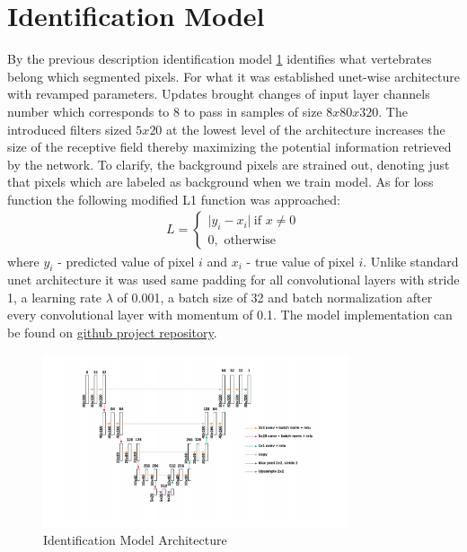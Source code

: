 \section{Identification Model}
By the previous description identification model \ref{fig:identification_model} identifies what vertebrates belong which segmented pixels. For what it was established unet-wise architecture with revamped parameters. Updates brought changes of input layer channels number which corresponds to 8 to pass in samples of size $8x80x320$. The introduced filters sized $5x20$ at the lowest level of the architecture  increases the size of the receptive field thereby maximizing the potential information retrieved by the network. To clarify, the background pixels are strained out, denoting just that pixels which are labeled as background when we train model. As for loss function the following modified L1 function was approached:
\begin{align*}
 L = \begin{cases} \lvert y_i - x_i \rvert\ \mbox{if } x\mbox{$\neq 0$} \\ 0, \mbox{ otherwise} \end{cases}
\end{align*}
where $y_i$ - predicted value of pixel $i$ and $x_i$ - true value of pixel $i$.
Unlike standard unet architecture it was used same padding for all convolutional layers with stride 1, a learning rate
$\lambda$ of 0.001, a batch size of 32 and batch normalization after every convolutional layer with momentum of 0.1. The model implementation can be found on \href{https://github.com/KumundzhievMaxim/VertebraeSegmentation/blob/main/train_identification_model.py}{\color{blue} github project repository}.

\begin{figure}[h]
    \centering \includegraphics[width=9cm]{images/identification_model.png}
    \caption {Identification Model Architecture}
    \label{fig:identification_model}
\end{figure}

